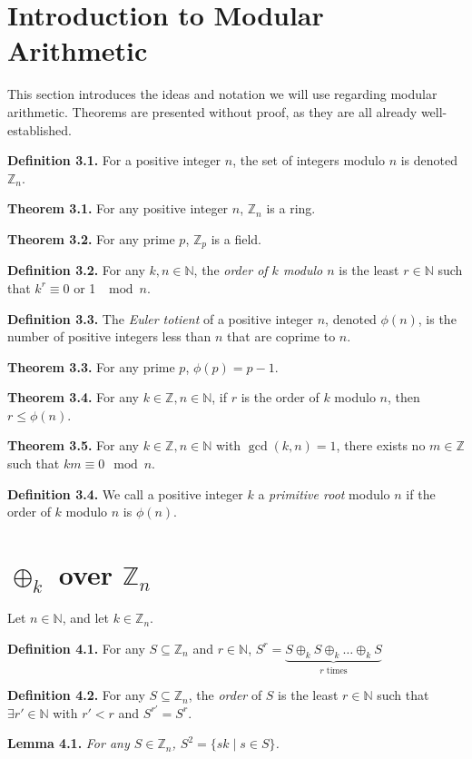 \documentclass{article}
\newcommand{\zee}{\mathbb{Z}}
\newcommand{\N}{\mathbb{N}}
\begin{document}
\setcounter{section}{2}
\section{Introduction to Modular Arithmetic}

This section introduces the ideas and notation we will use regarding
modular arithmetic.
Theorems are presented without proof,
as they are all already well-established.

\textbf{Definition 3.1.} For a positive integer $n$, the set of integers
modulo $n$ is denoted $\zee_n$.

\textbf{Theorem 3.1.} For any positive integer $n$, $\zee_n$ is a ring.

\textbf{Theorem 3.2.} For any prime $p$, $\zee_p$ is a field.

\textbf{Definition 3.2.} For any $k, n \in \N$, the \textit{order
of $k$ modulo $n$} is the least $r \in \N$ such that
$k^r \equiv 0$ or 1 $\mod n$.

\textbf{Definition 3.3.} The \textit{Euler totient} of a
positive integer $n$,
denoted $\phi(n)$, is the number of positive integers less than $n$
that are coprime to $n$.

\textbf{Theorem 3.3.} For any prime $p$, $\phi(p) = p - 1$.

\textbf{Theorem 3.4.} For any $k \in \zee, n \in \N$, if $r$ is the order of
$k$ modulo $n$, then $r \leq \phi(n)$.

\textbf{Theorem 3.5.} For any $k \in \zee, n \in \N$ with
$\gcd(k, n) = 1$, there exists no $m \in \zee$ such that
$km \equiv 0 \mod n$.

\textbf{Definition 3.4.} We call a positive integer $k$ a
\textit{primitive root} modulo $n$ if the order of $k$ modulo $n$
is $\phi(n)$.

\section{$\oplus_k$ over $\zee_n$}

Let $n \in \N$, and let $k \in \zee_n$.

\textbf{Definition 4.1.} For any $S \subseteq \zee_n$ and $r \in \N$,
$S^r = \underbrace{S \oplus_k S \oplus_k \ldots \oplus_k S}
_{r\text{ times}}$

\textbf{Definition 4.2.} For any $S \subseteq \zee_n$, the \textit{order}
of $S$ is the least $r \in \N$ such that $\exists r' \in \N$ with
$r' < r$ and $S^{r'} = S^r$.

\textbf{Lemma 4.1.} \textit{For any $S \in \zee_n$,
$S^2 = \{sk \mid s \in S\}$.}
\end{document}
